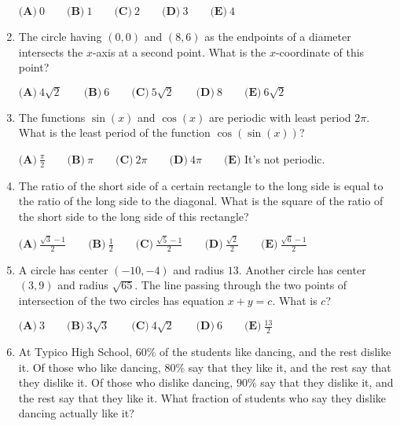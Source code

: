 \documentclass{article}
\begin{document}
\begin{enumerate}[label=\arabic*., itemsep=0.5em]
$\textbf{(A)}\ 0\qquad\textbf{(B)}\ 1\qquad\textbf{(C)}\ 2\qquad\textbf{(D)}\ 3\qquad\textbf{(E)}\ 4$\par \vspace{0.5em}\item The circle having $(0,0)$ and $(8,6)$ as the endpoints of a diameter intersects the $x$-axis at a second point. What is the $x$-coordinate of this point? 

$\textbf{(A)}\ 4\sqrt{2} \qquad \textbf{(B)}\ 6\qquad \textbf{(C)}\ 5\sqrt{2}\qquad \textbf{(D)}\ 8\qquad \textbf{(E)}\ 6\sqrt{2}$\par \vspace{0.5em}\item The functions $\sin(x)$ and $\cos(x)$ are periodic with least period $2\pi$. What is the least period of the function $\cos(\sin(x))$?

$\textbf{(A)}\ \frac{\pi}{2}\qquad\textbf{(B)}\ \pi\qquad\textbf{(C)}\ 2\pi \qquad\textbf{(D)}\ 4\pi \qquad\textbf{(E)}$ It's not periodic.\par \vspace{0.5em}\item The ratio of the short side of a certain rectangle to the long side is equal to the ratio of the long side to the diagonal. What is the square of the ratio of the short side to the long side of this rectangle?

$\textbf{(A)}\ \frac{\sqrt{3}-1}{2}\qquad\textbf{(B)}\ \frac{1}{2}\qquad\textbf{(C)}\ \frac{\sqrt{5}-1}{2} \qquad\textbf{(D)}\ \frac{\sqrt{2}}{2} \qquad\textbf{(E)}\ \frac{\sqrt{6}-1}{2}$\par \vspace{0.5em}\item A circle has center $(-10,-4)$ and radius $13$. Another circle has center $(3,9)$ and radius $\sqrt{65}$. The line passing through the two points of intersection of the two circles has equation $x + y = c$. What is $c$?

$\textbf{(A)}\ 3\qquad\textbf{(B)}\ 3\sqrt{3}\qquad\textbf{(C)}\ 4\sqrt{2}\qquad\textbf{(D)}\ 6\qquad\textbf{(E)}\ \frac{13}{2}$\par \vspace{0.5em}\item At Typico High School, $60\%$ of the students like dancing, and the rest dislike it. Of those who like dancing, $80\%$ say that they like it, and the rest say that they dislike it. Of those who dislike dancing, $90\%$ say that they dislike it, and the rest say that they like it. What fraction of students who say they dislike dancing actually like it?


\end{enumerate}
\end{document}
